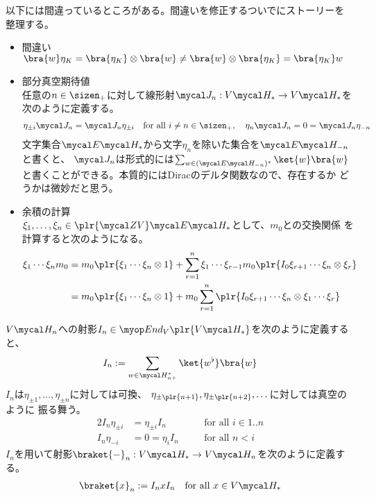 {	\begin{todo}[リファクタリング]\label{todo:リファクタリング} %
		以下には間違っているところがある。間違いを修正するついでにストーリーを
		整理する。
		\begin{itemize}\setlength{\itemsep}{-1mm} %
			\item 間違い \\
			$\bra{w}\eta_K=\bra{\eta_K}\otimes\bra{w}
			\neq\bra{w}\otimes\bra{\eta_K}=\bra{\eta_K}w$
			\item 部分真空期待値 \\
			任意の$n\in\sizen_+$に対して線形射$\J_n:V\Eta_*\to V\Eta_*$を
			次のように定義する。
			\begin{equation*}\begin{split}
				\eta_{\pm i}\J_n = \J_n\eta_{\pm i}
				\quad\text{for all } i\neq n\in\sizen_+,\quad
				\eta_n\J_n = 0 = \J_n\eta_{-n}
			\end{split}\end{equation*}
			文字集合$\E\Eta_*$から文字$\eta_n$を除いた集合を$\E\Eta_{-n}$と書くと、
			$\J_n$は形式的には$\sum_{w\in(\E\Eta_{-n})^*}\ket{w}\bra{w}$
			と書くことができる。本質的にはDiracのデルタ関数なので、存在するか
			どうかは微妙だと思う。
			\item 余積の計算 \\
			$\xi_1,\dots,\xi_n\in\plr{\Z V}\E\Eta_*$として、$m_0$との交換関係
			を計算すると次のようになる。
			\begin{equation*}\begin{split}
				\xi_1\cdots\xi_n m_0 &= m_0\plr{\xi_1\cdots\xi_n \otimes1}
					+ \sum_{r=1}^n \xi_1\cdots\xi_{r-1} m_0
					\plr{I_0\xi_{r+1}\cdots\xi_n\otimes\xi_r} \\
				&= m_0\plr{\xi_1\cdots\xi_n \otimes1} + m_0 \sum_{r=1}^n 
					\plr{I_0\xi_{r+1}\cdots\xi_n\otimes\xi_1\cdots\xi_r} \\
			\end{split}\end{equation*}
		\end{itemize} %
	\end{todo} %

	$V\Eta_n$への射影$I_n\in\End_V\plr{V\Eta_*}$を次のように定義すると、
	\begin{equation*}\begin{split}
		I_n := \sum_{w\in\Eta_{n+}^*}\ket{w^\flat}\bra{w}
	\end{split}\end{equation*}
	$I_n$は$\eta_{\pm1},\dots,\eta_{\pm n}$に対しては可換、
	$\eta_{\pm\plr{n+1}},\eta_{\pm\plr{n+2}},\dots$に対しては真空のように
	振る舞う。
	\begin{alignat*}{2}
		I_n\eta_{\pm i} &= \eta_{\pm i}I_n &\quad&\text{for all } i\in1..n \\
		I_n\eta_{-i} &= 0 = \eta_iI_n &\quad&\text{for all } n < i
	\end{alignat*}
	$I_n$を用いて射影$\braket{-}_n:V\Eta_*\to V\Eta_n$を次のように定義する。
	\begin{equation*}\begin{split}
		\braket{x}_n := I_nxI_n \quad\text{for all } x\in V\Eta_*
	\end{split}\end{equation*}

}
